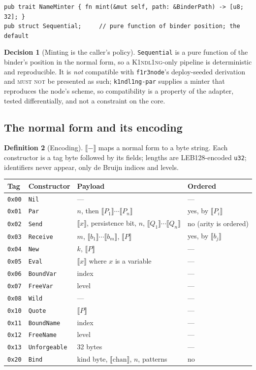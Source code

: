 \documentclass[11pt,a4paper]{article}
\newcommand{\code}[1]{\texttt{#1}}
\newcommand{\Kind}{\textsc{K1ndl1ng}}
\newcommand{\MUSTNOT}{\textsc{must not}}
\newcommand{\enc}[1]{\llbracket #1 \rrbracket}
\theoremstyle{definition}
\newtheorem{definition}{Definition}[section]
\newtheorem{decision}[definition]{Decision}
\theoremstyle{plain}
\begin{document}
\begin{lstlisting}
pub trait NameMinter { fn mint(&mut self, path: &BinderPath) -> [u8; 32]; }
pub struct Sequential;     // pure function of binder position; the default
\end{lstlisting}

\begin{decision}[Minting is the caller's policy]
\code{Sequential} is a pure function of the binder's position in the normal
form, so a \Kind-only pipeline is deterministic and reproducible. It is
\emph{not} compatible with \code{f1r3node}'s deploy-seeded derivation and
\MUSTNOT{} be presented as such; \code{k1ndl1ng-par} supplies a minter that
reproduces the node's scheme, so compatibility is a property of the adapter,
tested differentially, and not a constraint on the core.
\end{decision}

\subsection{The normal form and its encoding}

\begin{definition}[Encoding]\label{def:enc}
$\enc{-}$ maps a normal form to a byte string. Each constructor is a tag byte
followed by its fields; lengths are LEB128-encoded \code{u32}; identifiers never
appear, only de Bruijn indices and levels.
\end{definition}

\begin{center}
\begin{tabular}{@{}llll@{}}
\toprule
Tag & Constructor & Payload & Ordered\\
\midrule
\code{0x00} & \code{Nil} & --- & ---\\
\code{0x01} & \code{Par} & $n$, then $\enc{P_1}\cdots\enc{P_n}$ & yes, by $\enc{P_i}$\\
\code{0x02} & \code{Send} & $\enc{x}$, persistence bit, $n$, $\enc{Q_1}\cdots\enc{Q_n}$ & no (arity is ordered)\\
\code{0x03} & \code{Receive} & $m$, $\enc{b_1}\cdots\enc{b_m}$, $\enc{P}$ & yes, by $\enc{b_j}$\\
\code{0x04} & \code{New} & $k$, $\enc{P}$ & ---\\
\code{0x05} & \code{Eval} & $\enc{x}$ where $x$ is a variable & ---\\
\code{0x06} & \code{BoundVar} & index & ---\\
\code{0x07} & \code{FreeVar} & level & ---\\
\code{0x08} & \code{Wild} & --- & ---\\
\code{0x10} & \code{Quote} & $\enc{P}$ & ---\\
\code{0x11} & \code{BoundName} & index & ---\\
\code{0x12} & \code{FreeName} & level & ---\\
\code{0x13} & \code{Unforgeable} & 32 bytes & ---\\
\code{0x20} & \code{Bind} & kind byte, $\enc{\text{chan}}$, $n$, patterns & no\\
\bottomrule
\end{tabular}
\end{center}
\end{document}
